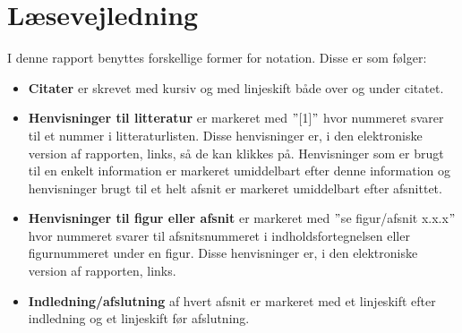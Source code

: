 \section*{Læsevejledning}
I denne rapport benyttes forskellige former for notation. Disse er som følger:

\begin{itemize}
\item \textbf{Citater} er skrevet med kursiv og med linjeskift både over og under citatet.

\item \textbf{Henvisninger til litteratur} er markeret med $"$[1]$"$ hvor nummeret svarer til et nummer i litteraturlisten. Disse henvisninger er, i den elektroniske version af rapporten, links, så de kan klikkes på. Henvisninger som er brugt til en enkelt information er markeret umiddelbart efter denne information og henvisninger brugt til et helt afsnit er markeret umiddelbart efter afsnittet.

\item \textbf{Henvisninger til figur eller afsnit} er markeret med $"$se figur/afsnit x.x.x$"$ hvor nummeret svarer til afsnitsnummeret i indholdsfortegnelsen eller figurnummeret under en figur. Disse henvisninger er, i den elektroniske version af rapporten, links.

\item \textbf{Indledning/afslutning} af hvert afsnit er markeret med et linjeskift efter indledning og et linjeskift før afslutning.
\end{itemize}